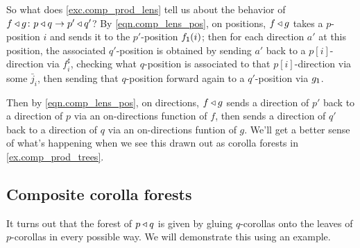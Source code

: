 \documentclass[Book-Poly]{subfiles}
\begin{document}
So what does \cref{exc.comp_prod_lens} tell us about the behavior of $f\mathbin{\triangleleft} g\colon p\mathbin{\triangleleft} q\to p'\mathbin{\triangleleft} q'$?
By \eqref{eqn.comp_lens_pos}, on positions, $f\mathbin{\triangleleft} g$ takes a $p$-position $i$ and sends it to the $p'$-position $f_{\textsf{1}}(i)$; then for each direction $a'$ at this position, the associated $q'$-position is obtained by sending $a'$ back to a $p[i]$-direction via $f^\sharp_i$, checking what $q$-position is associated to that $p[i]$-direction via some $\bar{j}_i$, then sending that $q$-position forward again to a $q'$-position via $g_{\textsf{1}}$.

Then by \eqref{eqn.comp_lens_pos}, on directions, $f\mathbin{\triangleleft} g$ sends a direction of $p'$ back to a direction of $p$ via an on-directions function of $f$, then sends a direction of $q'$ back to a direction of $q$ via an on-directions funtion of $g$.
We'll get a better sense of what's happening when we see this drawn out as corolla forests in \cref{ex.comp_prod_trees}.

\subsection{Composite corolla forests} \label{subsec.comon.comp.def.corolla}

It turns out that the forest of $p\mathbin{\triangleleft} q$ is given by gluing $q$-corollas onto the leaves of $p$-corollas in every possible way.
We will demonstrate this using an example.
\end{document}

